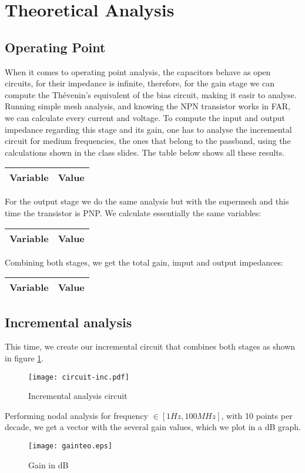 \section{Theoretical Analysis}
\label{sec:analysis}

\subsection{Operating Point}

When it comes to operating point analysis, the capacitors behave as open circuits, for their impedance is infinite, therefore, for the gain stage we can compute the Thévenin's equivalent of the bias circuit, making it easir to analyse. Running simple mesh analysis, and knowing the NPN transistor works in FAR, we can calculate every current and voltage.
To compute the input and output impedance regarding this stage and its gain, one has to analyse the incremental circuit for medium frequencies, the ones that belong to the passband, using the calculations shown in the class slides. The table below shows all these results.

\begin{tabular}{|l|r|}
  \hline    
  {\bf Variable} & {\bf Value} \\ \hline
  
\end{tabular}

For the output stage we do the same analysis but with the supermesh and this time the transistor is PNP. We calculate essentially the same variables:

\begin{tabular}{|l|r|}
  \hline    
  {\bf Variable} & {\bf Value} \\ \hline
  
\end{tabular}

Combining both stages, we get the total gain, imput and output impedances:

\begin{tabular}{|l|r|}
  \hline    
  {\bf Variable} & {\bf Value} \\ \hline
  
\end{tabular}

\subsection{Incremental analysis}

This time, we create our incremental circuit that combines both stages as shown in figure \ref{fig:circuit-inc}.

\begin{figure}[H] \centering
\texttt{[image: circuit-inc.pdf]}
\caption{Incremental analysis circuit}
\label{fig:circuit-inc}
\end{figure}

Performing nodal analysis for frequency $\in [1Hz, 100MHz]$, with 10 points per decade, we get a vector with the several gain values, which we plot in a dB graph.

\begin{figure}[H] \centering
\texttt{[image: gainteo.eps]}
\caption{Gain in dB}
\label{fig:grafteo}
\end{figure}